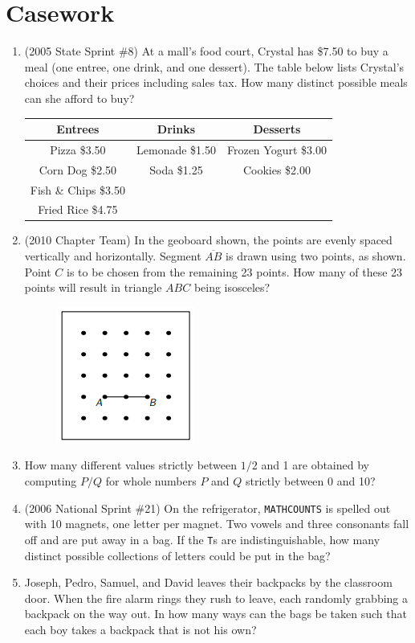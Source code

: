 \documentclass{article}
\begin{document}
\section*{Casework}

\begin{enumerate}
\item (2005 State Sprint \#8) At a mall's food court, Crystal has \$7.50 to buy a meal (one entree, one drink, and one dessert). The table below lists Crystal's choices and their prices including sales tax. How many distinct possible meals can she afford to buy?
\begin{table}[H]
\centering
\begin{tabular}{|c|c|c|} \hline 
Entrees & Drinks & Desserts \\ \hline 
Pizza \$3.50 & Lemonade \$1.50 & Frozen Yogurt \$3.00 \\ \hline
Corn Dog \$2.50 & Soda \$1.25 & Cookies \$2.00 \\ \hline 
Fish \& Chips \$3.50 & & \\ \hline
Fried Rice \$4.75 & & \\ \hline
\end{tabular}
\end{table}
\item (2010 Chapter Team) In the geoboard shown, the points are evenly spaced vertically and horizontally. Segment $\overline{AB}$ is drawn using two points, as shown. Point $C$ is to be chosen from the remaining 23 points. How many of these 23 points will result in triangle $ABC$ being isosceles?
\begin{figure}[H]
\centering
\includegraphics[scale=0.5]{geoboard.png}
\end{figure}
\item How many different values strictly between $1/2$ and 1 are obtained by computing $P/Q$ for whole numbers $P$ and $Q$ strictly between 0 and 10?\vspace{2cm}
\item (2006 National Sprint \#21) On the refrigerator, \texttt{MATHCOUNTS} is spelled out with 10 magnets, one letter per magnet. Two vowels and three consonants fall off and are put away in a bag. If the \texttt{T}s are indistinguishable, how many distinct possible collections of letters could be put in the bag?\vspace{2cm}
\item Joseph, Pedro, Samuel, and David leaves their backpacks by the classroom door. When the fire alarm rings they rush to leave, each randomly grabbing a backpack on the way out. In how many ways can the bags be taken such that each boy takes a backpack that is not his own?
\end{enumerate} 
\end{document}
